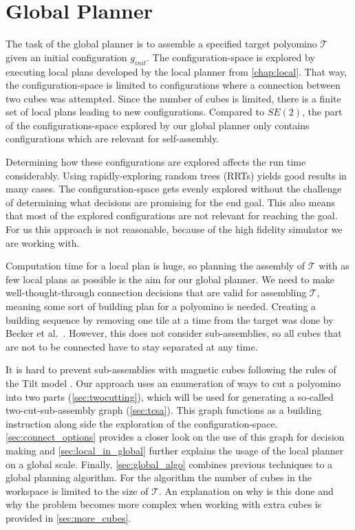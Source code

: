 \chapter{Global Planner}
\label{chap:global}

The task of the global planner is to assemble a specified target polyomino $\mathcal{T}$ given an initial configuration $g_\textit{init}$.
The configuration-space is explored by executing local plans developed by the local planner from \autoref{chap:local}.
That way, the configuration-space is limited to configurations where a connection between two cubes was attempted.
Since the number of cubes is limited, there is a finite set of local plans leading to new configurations.
Compared to $\textit{SE}(2)$, the part of the configurations-space explored by our global planner only contains configurations which are relevant for self-assembly.

Determining how these configurations are explored affects the run time considerably.
Using rapidly-exploring random trees (RRTs) \cite{lavalle1998} yields good results in many cases.
The configuration-space gets evenly explored without the challenge of determining what decisions are promising for the end goal.
This also means that most of the explored configurations are not relevant for reaching the goal.
For us this approach is not reasonable, because of the high fidelity simulator we are working with.

Computation time for a local plan is huge, so planning the assembly of $\mathcal{T}$ with as few local plans as possible is the aim for our global planner.
We need to make well-thought-through connection decisions that are valid for assembling $\mathcal{T}$, meaning some sort of building plan for a polyomino is needed.
Creating a building sequence by removing one tile at a time from the target was done by Becker et al.\ \cite{Becker2020}.
However, this does not consider sub-assemblies, so all cubes that are not to be connected have to stay separated at any time.

It is hard to prevent sub-assemblies with magnetic cubes following the rules of the Tilt model \cite{Becker2014_SP}.
Our approach uses an enumeration of ways to cut a polyomino into two parts (\autoref{sec:twocutting}), which will be used for generating a so-called two-cut-sub-assembly graph (\autoref{sec:tcsa}).
This graph functions as a building instruction along side the exploration of the configuration-space.
\autoref{sec:connect_options} provides a closer look on the use of this graph for decision making and \autoref{sec:local_in_global} further explains the usage of the local planner on a global scale. 
Finally, \autoref{sec:global_algo} combines previous techniques to a global planning algorithm.
For the algorithm the number of cubes in the workspace is limited to the size of $\mathcal{T}$.
An explanation on why is this done and why the problem becomes more complex when working with extra cubes is provided in \autoref{sec:more_cubes}.



